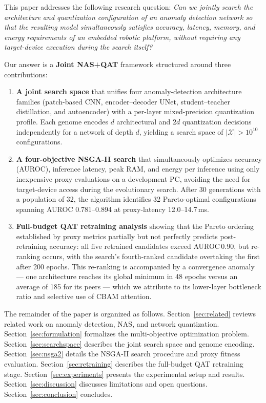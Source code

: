 \documentclass[journal]{IEEEtran}
\newcommand{\calX}{\mathcal{X}}
\begin{document}
This paper addresses the following research question:
\textit{Can we jointly search the architecture and quantization configuration
of an anomaly detection network so that the resulting model simultaneously
satisfies accuracy, latency, memory, and energy requirements of an embedded
robotic platform, without requiring any target-device execution during the
search itself?}

Our answer is a \textbf{Joint NAS+QAT} framework structured around three
contributions:

\begin{enumerate}

\item \textbf{A joint search space} that unifies four anomaly-detection
architecture families (patch-based CNN, encoder--decoder UNet, student--teacher
distillation, and autoencoder) with a per-layer mixed-precision quantization
profile.
Each genome encodes $d$ architectural and $2d$ quantization decisions
independently for a network of depth $d$, yielding a search space of
$|\calX| > 10^{10}$ configurations.

\item \textbf{A four-objective NSGA-II search} that simultaneously optimizes
accuracy (AUROC), inference latency, peak RAM, and energy per inference using
only inexpensive proxy evaluations on a development PC, avoiding the need for
target-device access during the evolutionary search.
After 30 generations with a population of 32, the algorithm identifies 32
Pareto-optimal configurations spanning AUROC 0.781--0.894 at proxy-latency
12.0--14.7\,ms.

\item \textbf{Full-budget QAT retraining analysis} showing that the Pareto
ordering established by proxy metrics partially but not perfectly predicts
post-retraining accuracy: all five retrained candidates exceed AUROC\,0.90,
but re-ranking occurs, with the search's fourth-ranked candidate overtaking the
first after 200 epochs.
This re-ranking is accompanied by a convergence anomaly — one architecture
reaches its global minimum in 48 epochs versus an average of 185 for its
peers — which we attribute to its lower-layer bottleneck ratio and
selective use of CBAM attention.

\end{enumerate}

The remainder of the paper is organized as follows.
Section~\ref{sec:related} reviews related work on anomaly detection,
NAS, and network quantization.
Section~\ref{sec:formulation} formalizes the multi-objective optimization
problem.
Section~\ref{sec:searchspace} describes the joint search space and genome
encoding.
Section~\ref{sec:nsga2} details the NSGA-II search procedure and proxy
fitness evaluation.
Section~\ref{sec:retraining} describes the full-budget QAT retraining stage.
Section~\ref{sec:experiments} presents the experimental setup and results.
Section~\ref{sec:discussion} discusses limitations and open questions.
Section~\ref{sec:conclusion} concludes.
\end{document}
